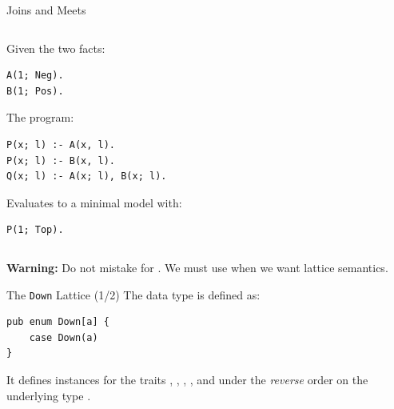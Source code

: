 \begin{frame}[fragile]{Joins and Meets}
\begin{columns}
\begin{column}{.5\textwidth}
Given the two facts:

\begin{lstlisting}[language=flix, xleftmargin=0.8cm]
A(1; Neg).
B(1; Pos).
\end{lstlisting}

The program:

\begin{lstlisting}[language=flix, xleftmargin=0.8cm]
P(x; l) :- A(x, l).
P(x; l) :- B(x, l).
Q(x; l) :- A(x; l), B(x; l).
\end{lstlisting}

\pause

Evaluates to a minimal model with:

\begin{lstlisting}[language=flix, xleftmargin=0.8cm]
P(1; Top).
\end{lstlisting}

\end{column}
\begin{column}{.5\textwidth}
\centering
{}
\end{column}
\end{columns}

\medskip

\pause

{
\small
\textbf{Warning:} Do not mistake \Code{,} for \Code{;}. We must use \Code{;}
when we want lattice semantics. 
}

\end{frame}

\begin{frame}[fragile]{The \texttt{Down} Lattice (1/2)}
The  data type is defined as: 

\begin{lstlisting}[language=flix, xleftmargin=0.8cm]
pub enum Down[a] {
    case Down(a)
}
\end{lstlisting}

It defines instances for the traits , ,
, , and  under the
\emph{reverse} order on the underlying type .
\end{frame}

